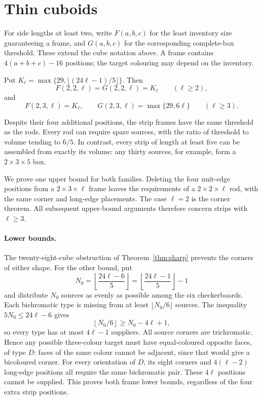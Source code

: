 \section{Thin cuboids}\label{sec:thin}
For side lengths at least two, write $F(a,b,c)$ for the least inventory
size guaranteeing a frame, and $G(a,b,c)$ for the corresponding complete-box
threshold. These extend the cube notation above. A frame contains
$4(a+b+c)-16$ positions; the target colouring may depend on the inventory.

\begin{theorem}\label{thm:thin}
Put $K_\ell=\max\{29,\lfloor(24\ell-1)/5\rfloor\}$. Then
\[
 F(2,2,\ell)=G(2,2,\ell)=K_\ell \qquad(\ell\ge2),
\]
and
\[
 F(2,3,\ell)=K_\ell,\qquad G(2,3,\ell)=\max\{29,6\ell\}
 \qquad(\ell\ge3).
\]
\end{theorem}
Despite their four additional positions, the strip frames have the same
threshold as the rods. Every rod can require spare sources, with the ratio
of threshold to volume tending to $6/5$. In contrast, every strip of length
at least five can be assembled from exactly its volume: any thirty sources,
for example, form a $2\times3\times5$ box.

We prove one upper bound for both families. Deleting the four unit-edge
positions from a $2\times3\times\ell$ frame leaves the requirements of a
$2\times2\times\ell$ rod, with the same corner and long-edge placements.
The case $\ell=2$ is the corner theorem. All subsequent upper-bound arguments
therefore concern strips with $\ell\ge3$.

\paragraph{Lower bounds.}
The twenty-eight-cube obstruction of Theorem~\ref{thm:sharp} prevents the
corners of either shape. For the other bound, put
\[
 N_0=\left\lfloor\frac{24\ell-6}{5}\right\rfloor
     =\left\lfloor\frac{24\ell-1}{5}\right\rfloor-1
\]
and distribute $N_0$ sources as evenly as possible among the six
checkerboards. Each bichromatic type is missing from at least
$\lfloor N_0/6\rfloor$ sources. The inequality
$5N_0\le24\ell-6$ gives
\[
 \left\lfloor N_0/6\right\rfloor\ge N_0-4\ell+1,
\]
so every type has at most $4\ell-1$ suppliers.
All source corners are trichromatic. Hence any possible three-colour target
must have equal-coloured opposite faces, of type $D$: faces of the same
colour cannot be adjacent, since that would give a bicoloured corner.
For every orientation of $D$, its eight corners and $4(\ell-2)$ long-edge
positions all require the same bichromatic pair. These $4\ell$ positions
cannot be supplied. This proves both frame lower bounds, regardless of the
four extra strip positions.

